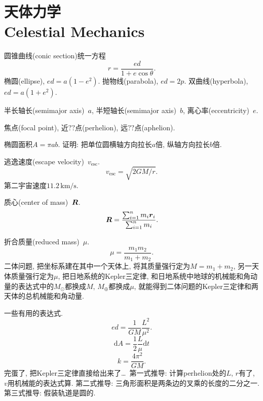 \chapter{天体力学\\Celestial Mechanics}

圆锥曲线(conic section)统一方程
\begin{equation*}
    r = \frac{ed}{1+e\cos\theta}.
\end{equation*}
椭圆(ellipse), $ed=a(1-e^2)$. 抛物线(parabola), $ed=2p$. 双曲线(hyperbola), $ed=a(1+e^2)$.

半长轴长(semimajor axis)~$a$, 半短轴长(semimajor axis)~$b$, 离心率(eccentricity)~$e$.

焦点(focal point), 近$\!\text{??}\!$点(perhelion), 远$\!\text{??}\!$点(aphelion).

椭圆面积$A=\pi ab$. 证明: 把单位圆横轴方向拉长$a$倍, 纵轴方向拉长$b$倍.

逃逸速度(escape velocity)~$v_\text{esc}$.
\begin{equation*}
    v_\text{esc} = \sqrt{2GM/r}.
\end{equation*}
第二宇宙速度$11.2\,\text{km/s}$.

质心(center of mass)~$\boldsymbol{R}$.
\begin{equation*}
    \boldsymbol{R} = \frac{
        \sum_{i=1}^n m_i\boldsymbol{r}_i
    }{
        \sum_{i=1}^n m_i
    }.
\end{equation*}

折合质量(reduced mass)~$\mu$.
\begin{equation*}
    \mu = \frac{m_1m_2}{m_1+m_2}.
\end{equation*}
二体问题, 把坐标系建在其中一个天体上, 将其质量强行定为$M=m_1+m_2$, 另一天体质量强行定为$\mu$, 把日地系统的Kepler三定律, 和日地系统中地球的机械能和角动量的表达式中的$M_\odot$都换成$M$, $M_\oplus$都换成$\mu$, 就能得到二体问题的Kepler三定律和两天体的总机械能和角动量.

一些有用的表达式.
\begin{equation*}
    ed = \frac{1}{GM}\frac{L^2}{\mu^2}.
\end{equation*}
\begin{equation*}
    \mathrm{d}A=\frac{1}{2}\frac{L}{\mu}\mathrm{d}t
\end{equation*}
\begin{equation*}
    k=\frac{4\pi^2}{GM}.
\end{equation*}
完蛋了, 把Kepler三定律直接给出来了\dots~第一式推导: 计算perhelion处的$L$, $r$有了, $v$用机械能的表达式算. 第二式推导: 三角形面积是两条边的叉乘的长度的二分之一. 第三式推导: 假装轨道是圆的.

